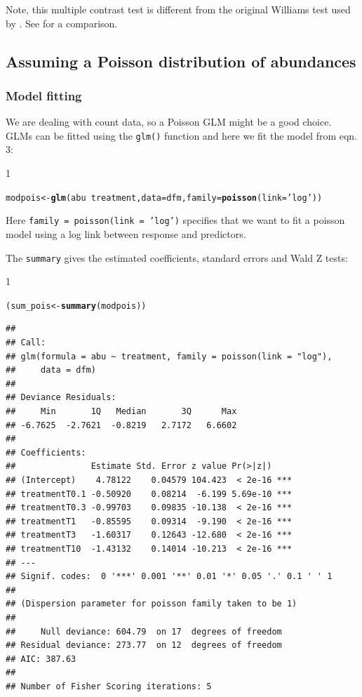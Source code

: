 \documentclass{scrartcl}\usepackage[]{graphicx}\usepackage[]{color}
\makeatletter
\newcommand{\hlstr}[1]{\textcolor[rgb]{0.192,0.494,0.8}{#1}}%
\newcommand{\hlopt}[1]{\textcolor[rgb]{0,0,0}{#1}}%
\newcommand{\hlstd}[1]{\textcolor[rgb]{0.345,0.345,0.345}{#1}}%
\newcommand{\hlkwb}[1]{\textcolor[rgb]{0.69,0.353,0.396}{#1}}%
\newcommand{\hlkwc}[1]{\textcolor[rgb]{0.333,0.667,0.333}{#1}}%
\newcommand{\hlkwd}[1]{\textcolor[rgb]{0.737,0.353,0.396}{\textbf{#1}}}%
\newenvironment{kframe}{%
 \def\at@end@of@kframe{}%
 \ifinner\ifhmode%
  \def\at@end@of@kframe{\end{minipage}}%
  \begin{minipage}{\columnwidth}%
 \fi\fi%
 \def\FrameCommand##1{\hskip\@totalleftmargin \hskip-\fboxsep
 \colorbox{shadecolor}{##1}\hskip-\fboxsep
     \hskip-\linewidth \hskip-\@totalleftmargin \hskip\columnwidth}%
 \MakeFramed {\advance\hsize-\width
   \@totalleftmargin\z@ \linewidth\hsize
   \@setminipage}}%
 {\par\unskip\endMakeFramed%
 \at@end@of@kframe}
\newenvironment{knitrout}{}{} %
\renewenvironment{knitrout}{\begin{spacing}{1}}{\end{spacing}}
\makeatother
\begin{document}
Note, this multiple contrast test is different from the original Williams test \citep{williams_comparison_1972} used by \citep{brock_minimum_2015}. See \citet{bretz_powerful_1999} for a comparison.




\subsection{Assuming a Poisson distribution of abundances}
\subsubsection{Model fitting}
We are dealing with count data, so a Poisson GLM might be a good choice.
GLMs can be fitted using the \texttt{glm()} function and here we fit the model from eqn. 3:
\begin{knitrout}
\color{fgcolor}\begin{kframe}
\begin{alltt}
\hlstd{modpois} \hlkwb{<-} \hlkwd{glm}\hlstd{(abu} \hlopt{~} \hlstd{treatment,} \hlkwc{data} \hlstd{= dfm,} \hlkwc{family} \hlstd{=} \hlkwd{poisson}\hlstd{(}\hlkwc{link} \hlstd{=} \hlstr{'log'}\hlstd{))}
\end{alltt}
\end{kframe}
\end{knitrout}

Here \texttt{family = poisson(link = 'log')} specifies that we want to fit a poisson model using a log link between response and predictors.

The \texttt{summary} gives the estimated coefficients, standard errors and Wald Z tests:
\begin{knitrout}
\color{fgcolor}\begin{kframe}
\begin{alltt}
\hlstd{(sum_pois} \hlkwb{<-} \hlkwd{summary}\hlstd{(modpois))}
\end{alltt}
\begin{verbatim}
## 
## Call:
## glm(formula = abu ~ treatment, family = poisson(link = "log"), 
##     data = dfm)
## 
## Deviance Residuals: 
##     Min       1Q   Median       3Q      Max  
## -6.7625  -2.7621  -0.8219   2.7172   6.6602  
## 
## Coefficients:
##               Estimate Std. Error z value Pr(>|z|)    
## (Intercept)    4.78122    0.04579 104.423  < 2e-16 ***
## treatmentT0.1 -0.50920    0.08214  -6.199 5.69e-10 ***
## treatmentT0.3 -0.99703    0.09835 -10.138  < 2e-16 ***
## treatmentT1   -0.85595    0.09314  -9.190  < 2e-16 ***
## treatmentT3   -1.60317    0.12643 -12.680  < 2e-16 ***
## treatmentT10  -1.43132    0.14014 -10.213  < 2e-16 ***
## ---
## Signif. codes:  0 '***' 0.001 '**' 0.01 '*' 0.05 '.' 0.1 ' ' 1
## 
## (Dispersion parameter for poisson family taken to be 1)
## 
##     Null deviance: 604.79  on 17  degrees of freedom
## Residual deviance: 273.77  on 12  degrees of freedom
## AIC: 387.63
## 
## Number of Fisher Scoring iterations: 5
\end{verbatim}
\end{kframe}
\end{knitrout}
\end{document}
